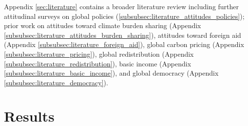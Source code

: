 \begin{bibunit}
Appendix \ref{sec:literature} contains a broader literature review including further attitudinal surveys on global policies (\ref{subsubsec:literature_attitudes_policies}); prior work on attitudes toward climate burden sharing (Appendix \ref{subsubsec:literature_attitudes_burden_sharing}), attitudes toward foreign aid (Appendix \ref{subsubsec:literature_foreign_aid}), global carbon pricing (Appendix \ref{subsubsec:literature_pricing}), global redistribution (Appendix \ref{subsubsec:literature_redistribution}), basic income (Appendix \ref{subsubsec:literature_basic_income}), and global democracy (Appendix \ref{subsubsec:literature_democracy}).



\section{Results}




\end{bibunit}
